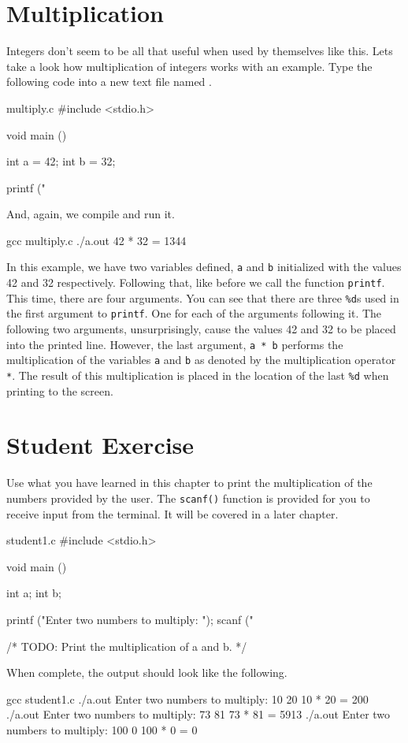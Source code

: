 \section{Multiplication}

Integers don't seem to be all that useful when used by themselves like this.
Lets take a look how multiplication of integers works with an example. Type
the following code into a new text file named .

\begin{code}{multiply.c}
#include <stdio.h>

void main ()
{
    int a = 42;
    int b = 32;

    printf ("%
}
\end{code}

And, again, we compile and run it.

\begin{Terminal}
gcc multiply.c
./a.out
42 * 32 = 1344
\end{Terminal}

In this example, we have two variables defined, \verb|a| and \verb|b|
initialized with the values 42 and 32 respectively. Following that, like before
we call the function \verb|printf|. This time, there are four arguments. You can
see that there are three \verb|%d|s used in the first argument to \verb|printf|.
One for each of the arguments following it. The following two arguments,
unsurprisingly, cause the values 42 and 32 to be placed into the printed line.
However, the last argument, \verb|a * b| performs the multiplication of the
variables \verb|a| and \verb|b| as denoted by the multiplication operator
\verb|*|. The result of this multiplication is placed in the location of the
last \verb|%d| when printing to the screen.

\section{Student Exercise}

Use what you have learned in this chapter to print the multiplication of
the numbers provided by the user. The \verb|scanf()| function is provided for
you to receive input from the terminal. It will be covered in a later chapter.

\begin{code}{student1.c}
#include <stdio.h>

void main ()
{
    int a;
    int b;

    printf ("Enter two numbers to multiply:  ");
    scanf ("%

    /* TODO: Print the multiplication of a and b. */
}
\end{code}

When complete, the output should look like the following.

\begin{Terminal}
gcc student1.c
./a.out
Enter two numbers to multiply:  10 20
10 * 20 = 200
./a.out
Enter two numbers to multiply:  73 81
73 * 81 = 5913
./a.out
Enter two numbers to multiply:  100 0
100 * 0 = 0
\end{Terminal}
